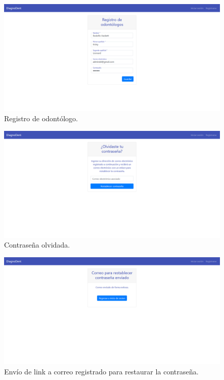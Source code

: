 \begin{figure}[H]
\centering
\includegraphics[width=17cm,keepaspectratio]{pictures/adminodo/login/inicio-reg-1.png}
\caption{Registro de odontólogo.}
\end{figure}


\begin{figure}[H]
\centering
\includegraphics[width=17cm,keepaspectratio]{pictures/adminodo/login/olvidar-pw.png}
\caption{Contraseña olvidada.}
\end{figure}


\begin{figure}[H]
\centering
\includegraphics[width=17cm,keepaspectratio]{pictures/adminodo/login/olvidar-pw-2.png}
\caption{Envío de link a correo registrado para restaurar la contraseña.}
\end{figure}

